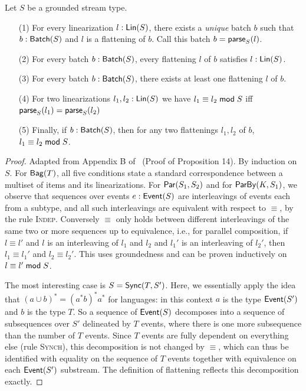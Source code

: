 \begin{proposition}
\label{prop:batch-lin-correspondence}
Let $S$ be a grounded stream type.
\begin{enumerate}
\item[(1)] For every linearization $\lintype{l}{S}$, there exists a \emph{unique} batch $b$ such that $\batchtype{b}{S}$ and $l$ is a flattening of $b$. Call this batch $b = \parselin{l}{S}$.
\item[(2)] For every batch $\batchtype{b}{S}$, every flattening $l$ of $b$ satisfies $\lintype{l}{S}$.
\item[(3)] For every batch $\batchtype{b}{S}$, there exists at least one flattening $l$ of $b$.
\item[(4)] For two linearizations $\lintype{l_1, l_2}{S}$ we have $\equivtype{l_1}{l_2}{S}$ iff $\parselin{l_1}{S} = \parselin{l_2}{S}$
\item[(5)] Finally, if $\batchtype{b}{S}$, then for any two flattenings $l_1, l_2$ of $b$, $\equivtype{l_1}{l_2}{S}$.
\end{enumerate}
\end{proposition}
\begin{proof}
Adapted from Appendix B of~ (Proof of Proposition 14).
By induction on $S$.
For $\relleaf{T}$,
all five conditions state a standard correspondence between a multiset of items and its linearizations.
For $\parcomp{S_1}{S_2}$
and for $\keyby{K}{S_1}$,
we observe that sequences over events $\eventtype{e}{S}$ are interleavings of events each from a subtype,
and all such interleavings are equivalent with respect to $\equiv$, by the rule \textsc{Indep}.
Conversely $\equiv$ only holds between different interleavings of the same two or more sequences up to equivalence, i.e., for parallel composition, if $l \equiv l'$ and $l$ is an interleaving of $l_1$ and $l_2$ and $l_1'$ is an interleaving of $l_2'$, then $l_1 \equiv l_1'$ and $l_2 \equiv l_2'$.
This uses groundedness and can be proven inductively on $\equivtype{l}{l'}{S}$.

The most interesting case is $S = \hier{T}{S'}$.
Here, we essentially apply the idea that $(a \cup b)^{*} = (a^{*} b)^{*} a^{*}$ for languages: in this context $a$ is the type $\event{S'}$ and $b$ is the type $T$.
So a sequence of $\event{S}$ decomposes into a sequence of subsequences over $S'$ delineated by $T$ events, where there is one more subsequence than the number of $T$ events.
Since $T$ events are fully dependent on everything else (rule \textsc{Synch}), this decomposition is not changed by $\equiv$, which can thus be identified with equality on the sequence of $T$ events together with equivalence on each $\event{S'}$ substream.
The definition of flattening reflects this decomposition exactly.
\end{proof}

